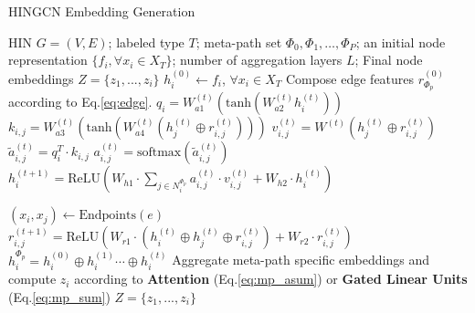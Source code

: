\begin{algorithm}
\caption{HINGCN Embedding Generation}
\label{alg}
\begin{algorithmic}[1]
\Require HIN $G=(V,E)$;
labeled type $T$;
meta-path set ${\Phi_0,\Phi_1,\ldots ,\Phi_P}$;
an initial node representation $\{ f_i,\forall x_i \in X_T \}$;
number of aggregation layers $L$;
\Ensure Final node embeddings $Z = \{z_1, ..., z_i\}$
\State $h^{(0)}_i \leftarrow f_i$, $\forall x_i \in X_T $
\State Compose edge features $r^{(0)}_{\Phi_p}$ according to Eq.\ref{eq:edge}.
\EndFor
{}
  \State $q_i= W_{a1}^{(t)}(\text{tanh}(W_{a2}^{(t)}h^{(t)}_i ))$
  \State $k_{i,j} = W_{a3}^{(t)}(\text{tanh}(W_{a4}^{(t)}(h^{(t)}_j \oplus r^{(t)}_{i,j}) ))$
  \State $v^{(t)}_{i,j} = W^{(t)}( h^{(t)}_j \oplus r^{(t)}_{i,j} )$
  \State $\tilde{a}^{(t)}_{i,j} = q_i^T \cdot k_{i,j}$
  \State $a^{(t)}_{i,j} = \text{softmax}(\tilde{a}^{(t)}_{i,j})$
 \EndFor
  \State $h^{(t+1)}_i = \text{ReLU}(W_{h1}\cdot \sum_{j\in N^{\Phi_p}_i} a^{(t)}_{i,j} \cdot v^{(t)}_{i,j}+ W_{h2}\cdot h^{(t)}_i) $
  \EndFor

  \State $(x_i,x_j) \leftarrow \text{Endpoints}(e)$
  \State $r^{(t+1)}_{i,j} = \text{ReLU}(W_{r1}\cdot (h^{(t)}_i \oplus h^{(t)}_j \oplus r^{(t)}_{i,j}) + W_{r2}\cdot r^{(t)}_{i,j})$
  \EndFor
 \EndFor
 \State $h^{\Phi_p}_i = h^{(0)}_i \oplus h^{(1)}_i \cdots \oplus h^{(t)}_i$
\EndFor
\State Aggregate meta-path specific embeddings and compute ${z}_i$ according to \textbf{Attention} (Eq.\ref{eq:mp_asum}) or \textbf{Gated Linear Units} (Eq.\ref{eq:mp_sum})
\State \Return $Z = \{z_1, ..., z_i\}$ 
\end{algorithmic}
\end{algorithm}









